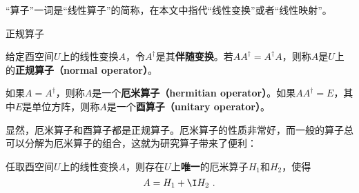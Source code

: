 




“算子”一词是“线性算子”的简称，在本文中指代“线性变换”或者“线性映射”。


\begin{definition}{正规算子}

给定酉空间$U$上的线性变换$A$，令$A^\dagger$是其\textbf{伴随变换}。若$AA^\dagger = A^\dagger A$，则称$A$是$U$上的\textbf{正规算子（normal operator）}。

如果$A=A^\dagger$，则称$A$是一个\textbf{厄米算子（hermitian operator）}。如果$AA^\dagger = E$，其中$E$是单位方阵，则称$A$是一个\textbf{酉算子（unitary operator）}。

\end{definition}


显然，厄米算子和酉算子都是正规算子。厄米算子的性质非常好，而一般的算子总可以分解为厄米算子的组合，这就为研究算子带来了便利：



\begin{lemma}{}
任取酉空间$U$上的线性变换$A$，则存在$U$上\textbf{唯一}的厄米算子$H_1$和$H_2$，使得
\begin{equation}
A = H_1 + \I H_2~. 
\end{equation}
\end{lemma}


































